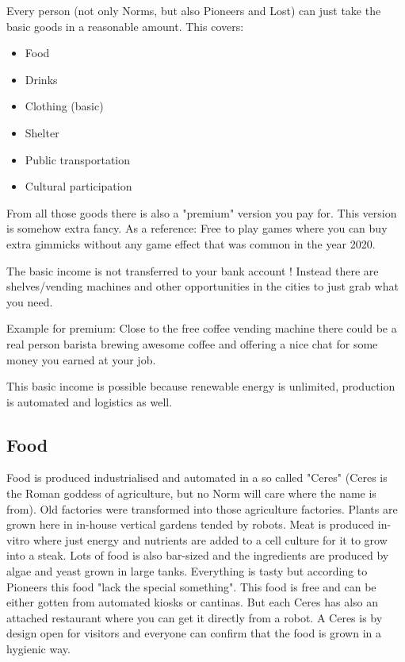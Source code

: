 Every person (not only Norms, but also Pioneers and Lost) can just take the basic goods in a reasonable amount. This covers:

\begin{itemize}
    \item Food
    \item Drinks
    \item Clothing (basic)
    \item Shelter
    \item Public transportation
    \item Cultural participation
\end{itemize}

From all those goods there is also a "premium" version you pay for. This version is somehow extra fancy. As a reference: Free to play games where you can buy extra gimmicks without any game effect that was common in the year 2020.

The basic income is not transferred to your bank account ! Instead there are shelves/vending machines and other opportunities in the cities to just grab what you need.

Example for premium: Close to the free coffee vending machine there could be a real person barista brewing awesome coffee and offering a nice chat for some money you earned at your job.

This basic income is possible because renewable energy is unlimited, production is automated and logistics as well.

\subsection{Food}
\label{sec: norm food}

Food is produced industrialised and automated in a so called "Ceres" (Ceres is the Roman goddess of agriculture, but no Norm will care where the name is from). Old factories were transformed into those agriculture factories. Plants are grown here in in-house vertical gardens tended by robots. Meat is produced in-vitro where just energy and nutrients are added to a cell culture for it to grow into a steak. Lots of food is also bar-sized and the ingredients are produced by algae and yeast grown in large tanks.
Everything is tasty but according to Pioneers this food "lack the special something".
This food is free and can be either gotten from automated kiosks or cantinas. But each Ceres has also an attached restaurant where you can get it directly from a robot. A Ceres is by design open for visitors and everyone can confirm that the food is grown in a hygienic way.

